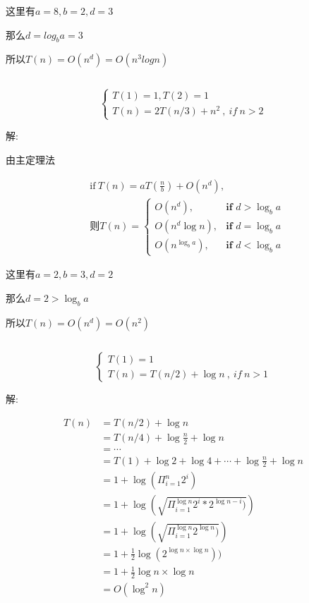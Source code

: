 \documentclass{article}
\begin{document}
\quad\quad\quad\quad 这里有$a = 8, b = 2, d = 3$

\quad\quad\quad\quad 那么$d = log_b a = 3$

\quad\quad\quad\quad 所以$T(n) = O(n^d) = O(n^3logn)$


\subsection{}

$$
\left\{
\begin{array}{l}
T(1) = 1, T(2) = 1\\
T(n) = 2T(n/3) + n^2\ ,\ if \ n>2
\end{array}
\right.
$$


解:

\quad\quad\quad\quad 由主定理法

\begin{align*}
    &\text{if}\  T(n) = a T(\frac{n}{b}) + O(n^d),\\
    &则T(n) = 
    \begin{cases}
        O(n^d), & \textbf{if } d > \log_ba\\
        O(n^d\log n),& \textbf{if } d = \log_ba\\
        O(n^{\log_ba}), & \textbf{if } d < \log_ba
    \end{cases}
\end{align*}

\quad\quad\quad\quad 这里有$a = 2, b = 3, d = 2$

\quad\quad\quad\quad 那么$d = 2 > \log_b a $

\quad\quad\quad\quad 所以$T(n) = O(n^d) = O(n^2)$

\subsection{}

$$
\left\{
\begin{array}{l}
T(1) = 1\\
T (n) = T (n/2) + \log n\ ,\ if \ n>1
\end{array}
\right.
$$

解:

\begin{align*}
T(n)&=T(n/2) + \log n \\
    &=T(n/4) + \log \frac{n}{2} + \log n \\
    &=\cdots\\
    &=T(1) + \log 2 + \log 4 + \cdots + \log \frac{n}{2} + \log n\\
    &=1+\log (\Pi_{i = 1}^n 2^i)\\
    &=1+\log (\sqrt{\Pi_{i = 1}^{\log n} 2^i * 2^{\log n - i})})\\
    &=1+\log (\sqrt{\Pi_{i = 1}^{\log n} 2^{\log n})})\\
    &=1+\frac{1}{2}\log ( 2^{{\log n} \times \log n}))\\
    &=1+\frac{1}{2} \log n \times \log n\\
    &=O(\log^2 n)
\end{align*}
\end{document}
